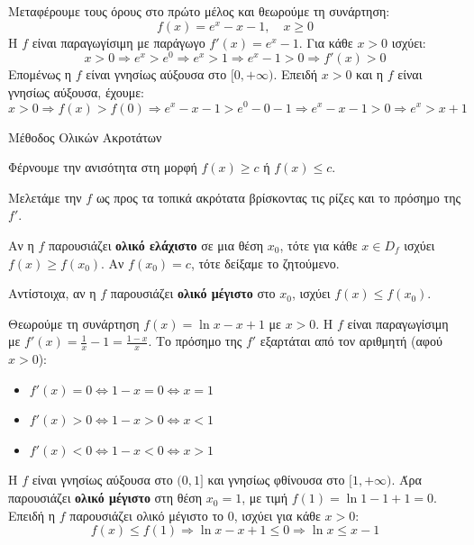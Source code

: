 
\lysh
Μεταφέρουμε τους όρους στο πρώτο μέλος και θεωρούμε τη συνάρτηση:
\[ f(x) = e^x - x - 1, \quad x \ge 0 \]
Η $f$ είναι παραγωγίσιμη με παράγωγο $f'(x) = e^x - 1$.
Για κάθε $x > 0$ ισχύει:
\[ x > 0 \Rightarrow e^x > e^0 \Rightarrow e^x > 1 \Rightarrow e^x - 1 > 0 \Rightarrow f'(x) > 0 \]
Επομένως η $f$ είναι γνησίως αύξουσα στο $[0, +\infty)$.
Επειδή $x > 0$ και η $f$ είναι γνησίως αύξουσα, έχουμε:
\[ x > 0 \Rightarrow f(x) > f(0) \Rightarrow e^x - x - 1 > e^0 - 0 - 1 \Rightarrow e^x - x - 1 > 0 \Rightarrow e^x > x + 1 \]

\begin{askhsh}{Μέθοδος Ολικών Ακροτάτων}
\bhmata\begin{bhma}
\item Φέρνουμε την ανισότητα στη μορφή $f(x) \ge c$ ή $f(x) \le c$.
\item Μελετάμε την $f$ ως προς τα τοπικά ακρότατα βρίσκοντας τις ρίζες και το πρόσημο της $f'$.
\item Αν η $f$ παρουσιάζει \textbf{ολικό ελάχιστο} σε μια θέση $x_0$, τότε για κάθε $x \in D_f$ ισχύει $f(x) \ge f(x_0)$. Αν $f(x_0) = c$, τότε δείξαμε το ζητούμενο.
\item Αντίστοιχα, αν η $f$ παρουσιάζει \textbf{ολικό μέγιστο} στο $x_0$, ισχύει $f(x) \le f(x_0)$.
\end{bhma}
\end{askhsh}


\lysh
Θεωρούμε τη συνάρτηση $f(x) = \ln x - x + 1$ με $x > 0$. Η $f$ είναι παραγωγίσιμη με $f'(x) = \frac{1}{x} - 1 = \frac{1-x}{x}$.
Το πρόσημο της $f'$ εξαρτάται από τον αριθμητή (αφού $x>0$):
\begin{itemize}
    \item $f'(x) = 0 \Leftrightarrow 1-x = 0 \Leftrightarrow x = 1$
    \item $f'(x) > 0 \Leftrightarrow 1-x > 0 \Leftrightarrow x < 1$
    \item $f'(x) < 0 \Leftrightarrow 1-x < 0 \Leftrightarrow x > 1$
\end{itemize}
Η $f$ είναι γνησίως αύξουσα στο $(0, 1]$ και γνησίως φθίνουσα στο $[1, +\infty)$. 
Άρα παρουσιάζει \textbf{ολικό μέγιστο} στη θέση $x_0 = 1$, με τιμή $f(1) = \ln 1 - 1 + 1 = 0$.
Επειδή η $f$ παρουσιάζει ολικό μέγιστο το $0$, ισχύει για κάθε $x > 0$:
\[ f(x) \le f(1) \Rightarrow \ln x - x + 1 \le 0 \Rightarrow \ln x \le x - 1 \]

